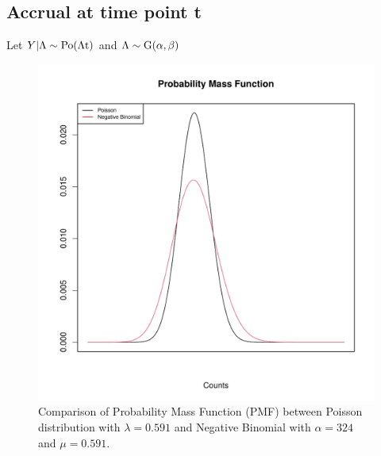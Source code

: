 % 
% 


\subsection{Accrual at time point t}
Let $Y|\Lambda \sim \rm{Po}(\Lambda t)$ and $\Lambda \sim \rm{G}(\alpha,\beta)$


\begin{figure}
\begin{knitrout}
\color{fgcolor}

{\centering \includegraphics[width=\textwidth-3cm]{figure/ch02_figunnamed-chunk-7-1} 

}


\end{knitrout}
  \caption{Comparison of Probability Mass Function (PMF) between Poisson distribution with $\lambda = 0.591$ and Negative Binomial with $\alpha = 324$ and $\mu = 0.591$.}
  \label{fig:2_6}
\end{figure}



